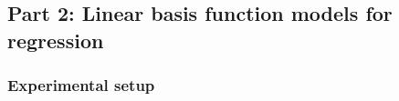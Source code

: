 \documentclass[a4]{article}
\begin{document}
\subsection{Part 2: Linear basis function models for regression}


\subsubsection{Experimental setup}
%
\end{document}
